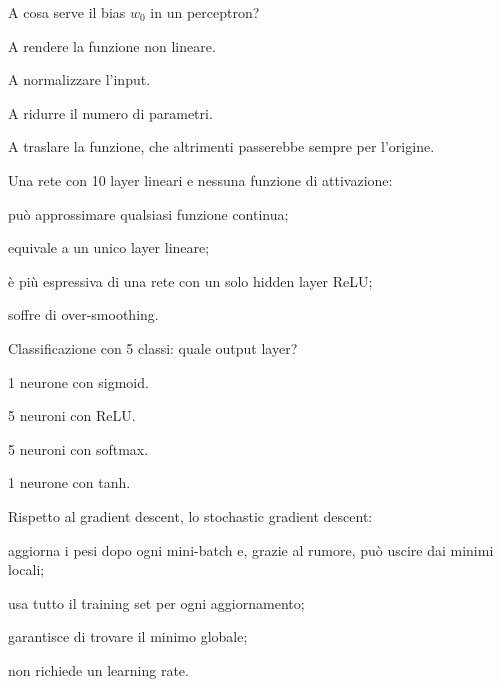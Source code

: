 \begin{domanda}[perceptron]\label{quiz:m7}
A cosa serve il bias $w_0$ in un perceptron?
\begin{opzioni}
  \item A rendere la funzione non lineare.
  \item A normalizzare l'input.
  \item A ridurre il numero di parametri.
  \item A traslare la funzione, che altrimenti passerebbe sempre per l'origine.
\end{opzioni}
\end{domanda}

\begin{domanda}\label{quiz:m8}
Una rete con 10 layer lineari e nessuna funzione di attivazione:
\begin{opzioni}
  \item può approssimare qualsiasi funzione continua;
  \item equivale a un unico layer lineare;
  \item è più espressiva di una rete con un solo hidden layer ReLU;
  \item soffre di over-smoothing.
\end{opzioni}
\end{domanda}

\begin{domanda}\label{quiz:m9}
Classificazione con 5 classi: quale output layer?
\begin{opzioni}
  \item 1 neurone con sigmoid.
  \item 5 neuroni con ReLU.
  \item 5 neuroni con softmax.
  \item 1 neurone con tanh.
\end{opzioni}
\end{domanda}

\begin{domanda}[ottimizzazione]\label{quiz:m10}
Rispetto al gradient descent, lo stochastic gradient descent:
\begin{opzioni}
  \item aggiorna i pesi dopo ogni mini-batch e, grazie al rumore, può uscire dai minimi locali;
  \item usa tutto il training set per ogni aggiornamento;
  \item garantisce di trovare il minimo globale;
  \item non richiede un learning rate.
\end{opzioni}
\end{domanda}


